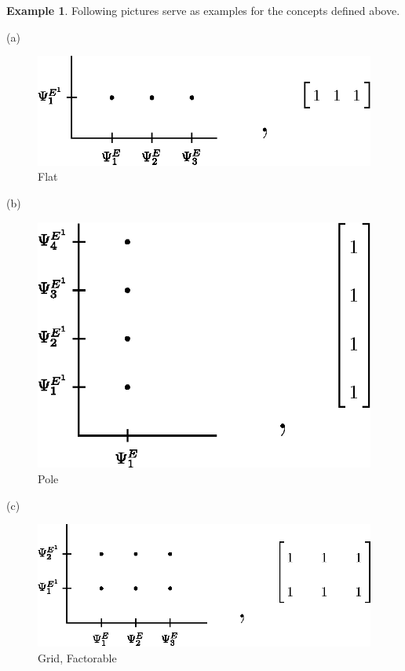 \documentclass[a4paper,12pt]{article}
\theoremstyle{definition}
\theoremstyle{underlinethm}
\newtheorem{example}{Example}[section]
\theoremstyle{definition}
\begin{document}
\begin{example}\label{example-3.2}
Following pictures serve as examples for the concepts defined above.

(a) 
\begin{figure}[h]
\centering
\includegraphics[scale=1.37]{figure/fig4.eps}
\caption{Flat}\label{fig04}
\end{figure}

\newpage
(b) 
\begin{figure}[h]
\centering
\includegraphics[scale=1.3]{figure/fig5.eps}
\caption{Pole}\label{fig05}
\end{figure}

(c)
\begin{figure}[h]
\centering
\includegraphics[scale=1.3]{figure/fig6.eps}
\caption{Grid, Factorable}\label{fig06}
\end{figure}


\end{example}
\end{document}
